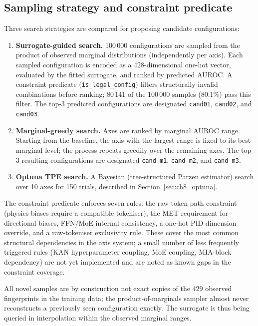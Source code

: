 \subsection{Sampling strategy and constraint predicate}

Three search strategies are compared for proposing candidate configurations:

\begin{enumerate}
  \item \textbf{Surrogate-guided search.} 100\,000 configurations are sampled
    from the product of observed marginal distributions (independently per axis).
    Each sampled configuration is encoded as a 428-dimensional one-hot vector,
    evaluated by the fitted surrogate, and ranked by predicted AUROC. A
    constraint predicate (\texttt{is\_legal\_config}) filters structurally
    invalid combinations before ranking; 80\,141 of the 100\,000 samples
    (80.1\%) pass this filter. The top-3 predicted configurations are designated
    \texttt{cand01}, \texttt{cand02}, and \texttt{cand03}.

  \item \textbf{Marginal-greedy search.} Axes are ranked by marginal AUROC
    range. Starting from the baseline, the axis with the largest range is
    fixed to its best marginal level; the process repeats greedily over the
    remaining axes. The top-3 resulting configurations are designated
    \texttt{cand\_m1}, \texttt{cand\_m2}, and \texttt{cand\_m3}.

  \item \textbf{Optuna TPE search.} A Bayesian (tree-structured Parzen
    estimator) search over 10 axes for 150 trials, described in
    Section~\ref{sec:ch8_optuna}.
\end{enumerate}

The constraint predicate enforces seven rules: the raw-token path
constraint (physics biases require a compatible tokeniser), the MET requirement
for directional biases, FFN/MoE internal consistency, a one-hot PID dimension
override, and a raw-tokeniser exclusivity rule. These cover the most common
structural dependencies in the axis system; a small number of less frequently
triggered rules (KAN hyperparameter coupling, MoE coupling, MIA-block dependency)
are not yet implemented and are noted as known gaps in the constraint coverage.

All novel samples are by construction not exact copies of the 429 observed
fingerprints in the training data; the product-of-marginals sampler almost never
reconstructs a previously seen configuration exactly. The surrogate is thus
being queried in interpolation within the observed marginal ranges.

